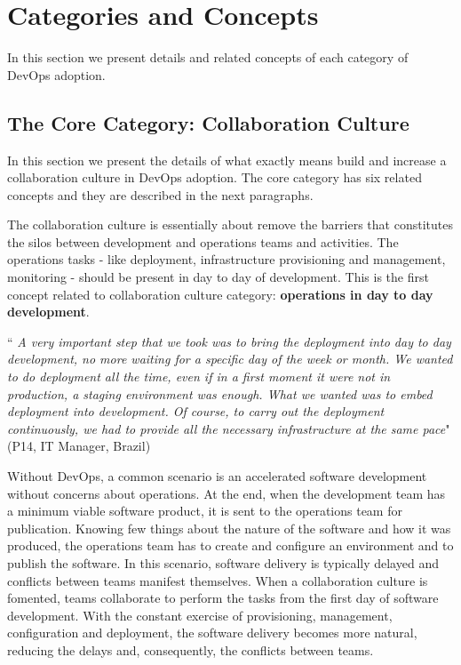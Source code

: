 \section{Categories and Concepts} \label{sec:categories_concepts}
In this section we present details and related concepts of each category of
DevOps adoption.

\subsection{The Core Category: Collaboration Culture}
In this section we present the details of what exactly means build and
increase a collaboration culture in DevOps adoption. The core category has six
related concepts and they are described in the next paragraphs.

The collaboration culture is essentially about remove the barriers that
constitutes the silos between development and operations teams and activities.
The operations tasks - like deployment, infrastructure provisioning and
management, monitoring - should be present in day to day of development. This
is the first concept related to collaboration culture category:
\textbf{operations in day to day development}.

\begin{mq}
``\emph{
A very important step that we took was to bring the deployment into day to day
development, no more waiting for a specific day of the week or month. We wanted
to do deployment all the time, even if in a first moment it were not in
production, a staging environment was enough. What we wanted was to embed
deployment into development. Of course, to carry out the deployment
continuously, we had to provide all the necessary infrastructure at the same
pace}" (P14, IT Manager, Brazil)
\end{mq}

Without DevOps, a common scenario is an accelerated software development
without concerns about operations. At the end, when the development team has a
minimum viable software product, it is sent to the operations team for
publication. Knowing few things about the nature of the software and how it
was produced, the operations team has to create and configure an environment
and to publish the software. In this scenario, software delivery is typically
delayed and conflicts between teams manifest themselves. When a collaboration
culture is fomented, teams collaborate to perform the tasks from the first day
of software development. With the constant exercise of provisioning, management,
configuration and deployment, the software delivery becomes more natural,
reducing the delays and, consequently, the conflicts between teams.

